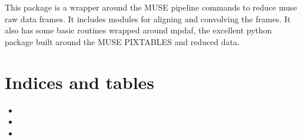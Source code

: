 \documentclass[letterpaper,10pt,english]{sphinxmanual}
\begin{document}
\sphinxAtStartPar
This package is a wrapper around the MUSE pipeline commands to reduce
muse raw data frames. It includes modules for aligning and convolving the frames.
It also has some basic routines wrapped around mpdaf, the excellent
python package built around the MUSE PIXTABLES and reduced data.


\chapter{Indices and tables}
\label{\detokenize{index:indices-and-tables}}\begin{itemize}
\item {} 
\sphinxAtStartPar
{}

\item {} 
\sphinxAtStartPar
{}

\item {} 
\sphinxAtStartPar
{}

\end{itemize}
\end{document}
